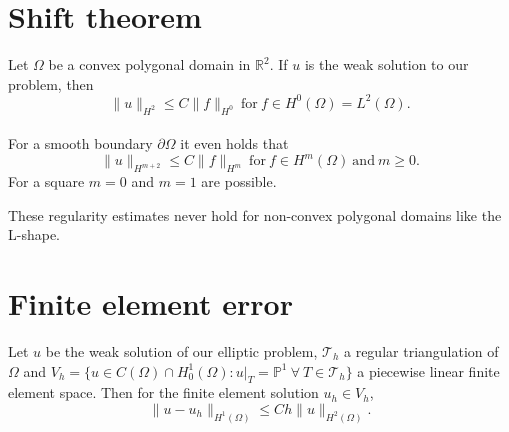 \documentclass[pagesize]{scrartcl}
\begin{document}
\flushleft







\vspace{0.1cm}
\section{Shift theorem}

Let $\Omega$ be a convex polygonal domain in $\mathbb{R}^2$. If $u$ is the weak solution to our problem, then 
\begin{equation}
	\| u \|_{H^2} \leq C \| f \|_{H^0} \ \text{for} \ f \in H^0(\Omega) = L^2(\Omega).  \label{st}
\end{equation}\\[0.5ex]

For a smooth boundary $\partial \Omega$ it even holds that \begin{equation*}
	\|u\|_{H^{m+2}} \leq C \|f\|_{H^m} \ \text{for} \ f \in  H^m(\Omega) \ \text{and} \ m \geq 0.
\end{equation*}
For a square $m=0$ and $m=1$ are possible.


These regularity estimates never hold for non-convex polygonal domains like the L-shape.









\newpage
\section{Finite element error}
Let $u$ be the weak solution of our elliptic problem, $\mathcal{T}_h$ a regular triangulation of $\Omega$ and $V_h = \{u \in C(\Omega) \cap H_0^1(\Omega): u|_T = \mathbb{P}^1 \ \forall\ T \in \mathcal{T}_h \}$ a piecewise linear finite element space.
Then for the finite element solution $u_h \in V_h$,
\begin{equation}
	\|u - u_h\|_{H^1(\Omega)} \leq C h \|u\|_{H^2(\Omega)}. \label{fee}
\end{equation}
\end{document}

